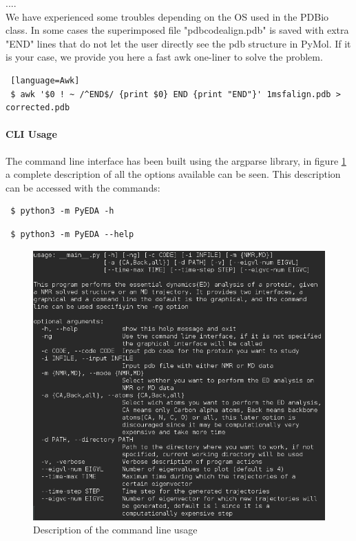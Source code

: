 \documentclass[12pt]{article}
\begin{document}
 
 
 
 ....\\
 
 We have experienced some troubles depending on the OS used in the PDBio class. In some cases the superimposed file "pdbcodealign.pdb" is saved with extra "END" lines that do not let the user directly see the pdb structure in PyMol. If it is your case, we provide you here a fast awk one-liner to solve the problem.  
 \begin{lstlisting} [language=Awk]
 $ awk '$0 ! ~ /^END$/ {print $0} END {print "END"}' 1msfalign.pdb > corrected.pdb
 \end{lstlisting}
 \paragraph{CLI Usage}
 The command line interface has been built using the argparse library, in figure \ref{fig:usage} a complete description of all the options available can be seen. This description can be accessed with the commands:
 \begin{lstlisting}
 $ python3 -m PyEDA -h 
 \end{lstlisting}
 \begin{lstlisting}
 $ python3 -m PyEDA --help
 \end{lstlisting}
 \begin{figure}[h]
 \centering
 \includegraphics[scale=0.4]{usage.png}
 \caption{Description of the command line usage}
 \label{fig:usage}
 \end{figure}
 
\end{document}
